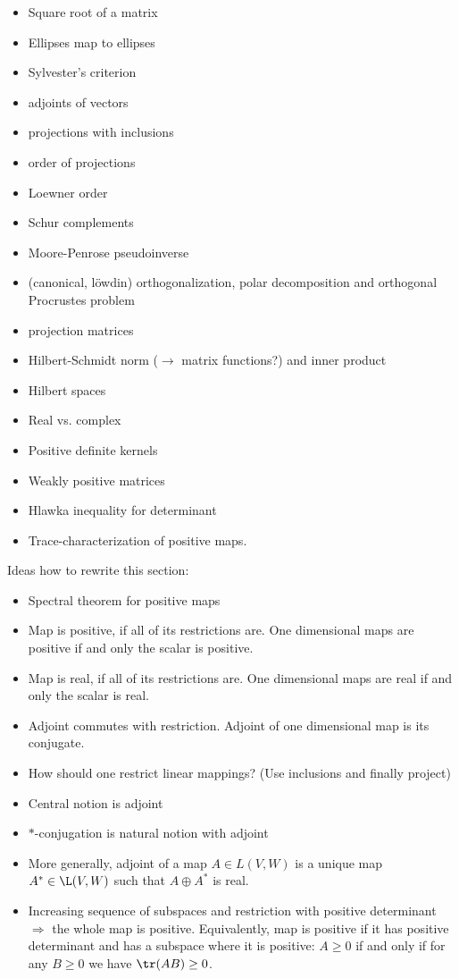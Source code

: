 \begin{itemize}
	\item Square root of a matrix
	\item Ellipses map to ellipses
	\item Sylvester's criterion
	\item adjoints of vectors
	\item projections with inclusions
	\item order of projections
	\item Loewner order
	\item Schur complements
	\item Moore-Penrose pseudoinverse
	\item (canonical, löwdin) orthogonalization, polar decomposition and orthogonal Procrustes problem
	\item projection matrices
	\item Hilbert-Schmidt norm ($\to$ matrix functions?) and inner product
	\item Hilbert spaces
	\item Real vs. complex
	\item Positive definite kernels
	\item Weakly positive matrices
	\item Hlawka inequality for determinant %
	\item Trace-characterization of positive maps.
\end{itemize}

Ideas how to rewrite this section:
\begin{itemize}
	\item Spectral theorem for positive maps
	\item Map is positive, if all of its restrictions are. One dimensional maps are positive if and only the scalar is positive.
	\item Map is real, if all of its restrictions are. One dimensional maps are real if and only the scalar is real.
	\item Adjoint commutes with restriction. Adjoint of one dimensional map is its conjugate.
	\item How should one restrict linear mappings? (Use inclusions and finally project)
	\item Central notion is adjoint
	\item $*$-conjugation is natural notion with adjoint
	\item More generally, adjoint of a map $A \in L(V, W)$ is a unique map $A^{*} \in \L(V, W)$ such that $A \oplus A^{*}$ is real.
	\item Increasing sequence of subspaces and restriction with positive determinant $\Rightarrow$ the whole map is positive. Equivalently, map is positive if it has positive determinant and has a subspace where it is positive: $A \geq 0$ if and only if for any $B \geq 0$ we have $\tr(A B) \geq 0$.
\end{itemize}






